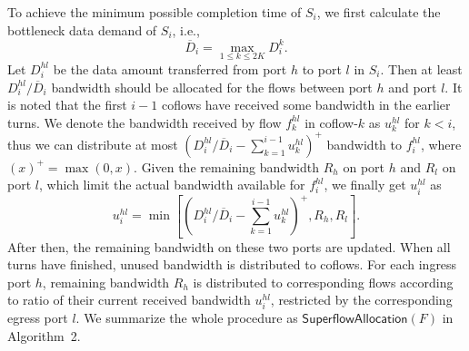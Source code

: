 \documentclass[10pt, conference, letterpaper]{IEEEtran}
\begin{document}
To achieve the minimum possible completion time of $S_i$, we first calculate the bottleneck data demand of $S_i$, i.e.,
\begin{equation}
	\overline{D}_i = \max_{1\leq k\leq 2K}D_i^k.
\end{equation}
Let $D_i^{hl}$ be the data amount transferred from port $h$ to port $l$ in $S_i$. Then at least $D_i^{hl}/\overline{D}_i$ bandwidth should be allocated for the flows between port $h$ and port $l$. It is noted that the first $i-1$ coflows have received some bandwidth in the earlier turns. We denote the bandwidth received by flow $f_k^{hl}$ in coflow-$k$ as $u_k^{hl}$ for $k < i$, thus we can distribute at most $(D_i^{hl}/\overline{D}_i - \sum_{k=1}^{i-1}u_k^{hl})^+$ bandwidth to $f_i^{hl}$, where $(x)^+=\max(0,x)$. Given the remaining bandwidth $R_h$ on port $h$ and $R_l$ on port $l$, which limit the actual bandwidth available for $f_i^{hl}$, we finally get $u_i^{hl}$ as
\begin{equation}
	u_i^{hl} = \min[(D_i^{hl}/\overline{D}_i - \sum_{k=1}^{i-1}u_k^{hl})^+,R_h,R_l].
\end{equation}
After then, the remaining bandwidth on these two ports are updated. When all turns have finished, unused bandwidth is distributed to coflows. For each ingress port $h$, remaining bandwidth $R_h$ is distributed to corresponding flows according to ratio of their current received bandwidth $u_i^{hl}$, restricted by the corresponding egress port $l$. We summarize the whole procedure as $\mathsf{SuperflowAllocation}(F)$ in Algorithm~2.
\end{document}
